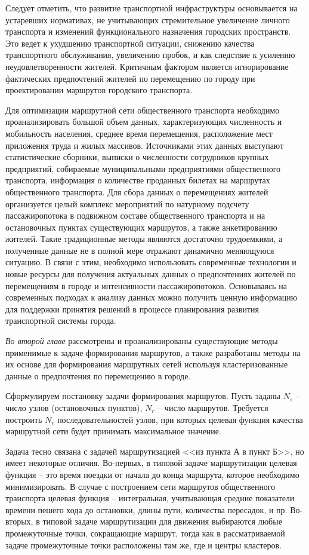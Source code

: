 Следует отметить, что развитие транспортной инфраструктуры основывается на устаревших нормативах, не 
учитывающих стремительное увеличение личного транспорта и изменений функционального назначения городских 
пространств. Это ведет к ухудшению транспортной ситуации, снижению качества транспортного обслуживания, 
увеличению пробок, и как следствие к усилению неудовлетворенности жителей. Критичным фактором является 
игнорирование фактических предпочтений жителей по перемещению по городу при проектировании маршрутов 
городского транспорта.

Для оптимизации маршрутной сети общественного транспорта необходимо проанализировать большой объем данных, 
характеризующих численность и мобильность населения, среднее время перемещения, расположение мест приложения 
труда и жилых массивов. Источниками этих данных выступают статистические сборники, выписки о численности 
сотрудников крупных предприятий, собираемые муниципальными предприятиями общественного транспорта, 
информация о количестве проданных билетах на маршрутах общественного транспорта. Для сбора данных о 
перемещениях жителей организуется целый комплекс мероприятий по натурному подсчету пассажиропотока в 
подвижном составе общественного транспорта и на остановочных пунктах существующих маршрутов, а также 
анкетированию жителей. Такие традиционные методы являются достаточно трудоемкими, а полученные данные не в 
полной мере отражают динамично меняющуюся ситуацию. В связи с этим, необходимо использовать современные 
технологии и новые ресурсы для получения актуальных данных о предпочтениях жителей по перемещениям в городе 
и интенсивности пассажиропотоков. Основываясь на современных подходах к анализу данных можно получить 
ценную информацию для поддержки принятия решений в процессе планирования развития транспортной системы 
города.

\emph{Во второй главе} рассмотрены и проанализированы существующие методы применимые к задаче формирования 
маршрутов, а также разработаны методы на их основе для формирования маршрутных сетей используя 
кластеризованные данные о предпочтения по перемещению в городе.

Сформулируем постановку задачи формирования маршрутов. Пусть заданы \( N_s \) – число узлов (остановочных 
пунктов), \( N_r \) – число маршрутов. Требуется построить \( N_r \) последовательностей узлов, при которых 
целевая функция качества маршрутной сети будет принимать максимальное значение. 

Задача тесно связана с задачей маршрутизацией <<из пункта А в пункт Б>>, но имеет некоторые отличия. 
Во-первых, в типовой задаче маршрутизации целевая функция – это время поездки от начала до конца маршрута, 
которое необходимо минимизировать. В случае с построением сети маршрутов общественного транспорта целевая 
функция -- интегральная, учитывающая средние показатели времени пешего хода до остановки, длины пути, 
количества пересадок, и пр. Во-вторых, в типовой задаче маршрутизации для движения выбираются любые 
промежуточные точки, сокращающие маршрут, тогда как в рассматриваемой задаче промежуточные точки 
расположены там же, где и центры кластеров.

